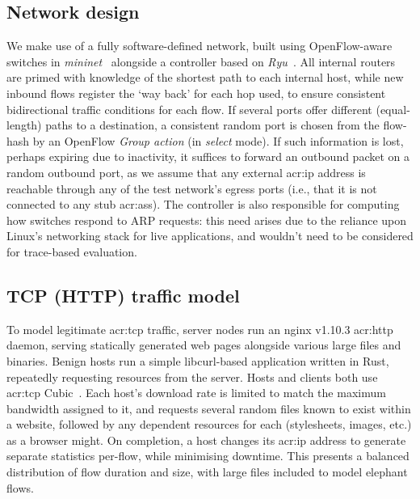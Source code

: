 \subsection{Network design}
We make use of a fully software-defined network, built using OpenFlow-aware switches in \emph{mininet}~\parencite{mininet} alongside a controller based on \emph{Ryu}~\parencite{ryu}.
All internal routers are primed with knowledge of the shortest path to each internal host, while new inbound flows register the `way back' for each hop used, to ensure consistent bidirectional traffic conditions for each flow.
If several ports offer different (equal-length) paths to a destination, a consistent random port is chosen from the flow-hash by an OpenFlow \emph{Group action} (in \emph{select} mode).
If such information is lost, perhaps expiring due to inactivity, it suffices to forward an outbound packet on a random outbound port, as we assume that any external \gls{acr:ip} address is reachable through any of the test network's egress ports (i.e., that it is not connected to any stub \glspl{acr:as}).
The controller is also responsible for computing how switches respond to ARP requests: this need arises due to the reliance upon Linux's networking stack for live applications, and wouldn't need to be considered for trace-based evaluation.

\subsection{TCP (HTTP) traffic model}\label{sec:tcp-http-traffic-model}
To model legitimate \gls{acr:tcp} traffic, server nodes run an nginx v1.10.3 \gls{acr:http} daemon, serving statically generated web pages alongside various large files and binaries.
Benign hosts run a simple libcurl-based application written in Rust, repeatedly requesting resources from the server.
Hosts and clients both use \gls{acr:tcp} Cubic~\parencite{rfc8312}.
Each host's download rate is limited to match the maximum bandwidth assigned to it, and requests several random files known to exist within a website, followed by any dependent resources for each (stylesheets, images, etc.) as a browser might.
On completion, a host changes its \gls{acr:ip} address to generate separate statistics per-flow, while minimising downtime.
This presents a balanced distribution of flow duration and size, with large files included to model elephant flows.

